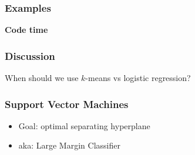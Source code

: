 \begin{frame}
  \frametitle{Examples}

  \vfill
  \centerline{\huge{\bf Code time}}
\end{frame}

\begin{frame}
  \frametitle{Discussion}

  When should we use $k$-means vs logistic regression?
  
\end{frame}


\begin{frame}
  \frametitle{Support Vector Machines}

   {
    \begin{itemize}
    \item Goal: optimal separating hyperplane
    \item aka: Large Margin Classifier
    \end{itemize}
  }

\end{frame}


